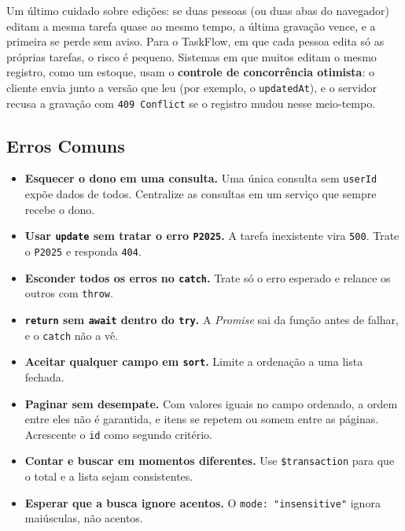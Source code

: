 Um último cuidado sobre edições: se duas pessoas (ou duas abas do navegador) editam a mesma tarefa quase ao mesmo tempo, a última gravação vence, e a primeira se perde sem aviso. Para o TaskFlow, em que cada pessoa edita só as próprias tarefas, o risco é pequeno. Sistemas em que muitos editam o mesmo registro, como um estoque, usam o \textbf{controle de concorrência otimista}: o cliente envia junto a versão que leu (por exemplo, o \texttt{updatedAt}), e o servidor recusa a gravação com \texttt{409 Conflict} se o registro mudou nesse meio-tempo.

\subsection{Erros Comuns}

\begin{itemize}
  \item \textbf{Esquecer o dono em uma consulta.} Uma única consulta sem \texttt{userId} expõe dados de todos. Centralize as consultas em um serviço que sempre recebe o dono.
  \item \textbf{Usar \texttt{update} sem tratar o erro \texttt{P2025}.} A tarefa inexistente vira \texttt{500}. Trate o \texttt{P2025} e responda \texttt{404}.
  \item \textbf{Esconder todos os erros no \texttt{catch}.} Trate só o erro esperado e relance os outros com \texttt{throw}.
  \item \textbf{\texttt{return} sem \texttt{await} dentro do \texttt{try}.} A \textit{Promise} sai da função antes de falhar, e o \texttt{catch} não a vê.
  \item \textbf{Aceitar qualquer campo em \texttt{sort}.} Limite a ordenação a uma lista fechada.
  \item \textbf{Paginar sem desempate.} Com valores iguais no campo ordenado, a ordem entre eles não é garantida, e itens se repetem ou somem entre as páginas. Acrescente o \texttt{id} como segundo critério.
  \item \textbf{Contar e buscar em momentos diferentes.} Use \texttt{\$transaction} para que o total e a lista sejam consistentes.
  \item \textbf{Esperar que a busca ignore acentos.} O \texttt{mode: "insensitive"} ignora maiúsculas, não acentos.
\end{itemize}
